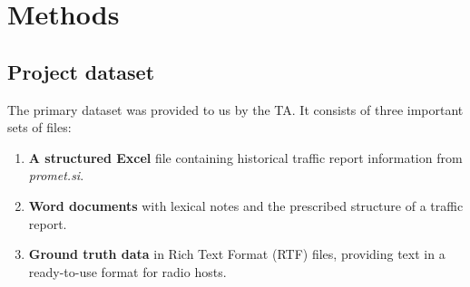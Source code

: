 \documentclass[fleqn,moreauthors,10pt]{ds_report}
\begin{document}
\section{Methods}

\subsection*{Project dataset}

The primary dataset was provided to us by the TA. It consists of three important sets of files:

\begin{enumerate}
    \item \textbf{A structured Excel }file containing historical traffic report information from \textit{promet.si}.
    \item \textbf{Word documents} with lexical notes and the prescribed structure of a traffic report.
    \item \textbf{Ground truth data} in Rich Text Format (RTF) files, providing text in a ready-to-use format for radio hosts.
\end{enumerate}





\end{document}
